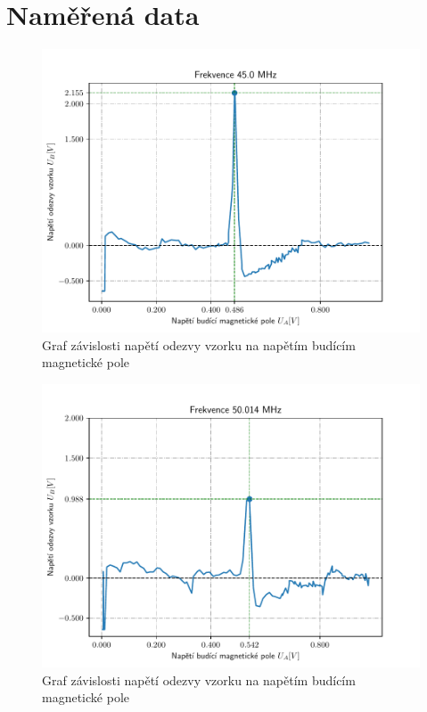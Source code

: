 \documentclass{article}
\begin{document}
\section{Naměřená data}
\begin{figure}[!h]
  \hspace*{-10em}
  \includegraphics[scale=1.2]{figs/1.pdf}
  \caption{Graf závislosti napětí odezvy vzorku na napětím budícím magnetické pole}
\end{figure}
\clearpage
\begin{figure}[!h]
  \hspace*{-10em}
  \includegraphics[scale=1.2]{figs/2.pdf}
  \caption{Graf závislosti napětí odezvy vzorku na napětím budícím magnetické pole}
\end{figure}
\end{document}
